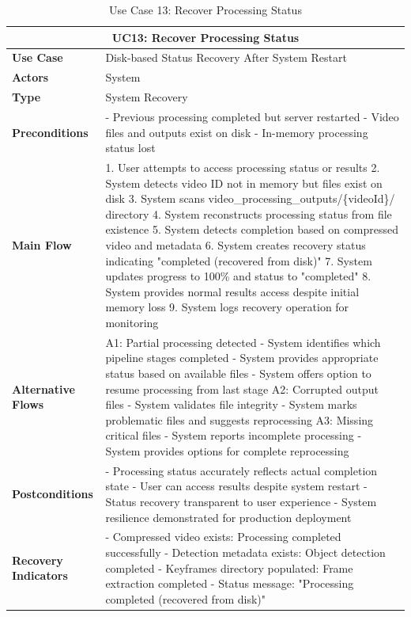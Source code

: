 \documentclass{article}
\begin{document}
\begin{table}[H]
\centering
\begin{tabularx}{\textwidth}{|l|X|}
\hline
\multicolumn{2}{|c|}{\textbf{UC13: Recover Processing Status}} \\ \hline
\textbf{Use Case} & Disk-based Status Recovery After System Restart \\ \hline
\textbf{Actors} & System \\ \hline
\textbf{Type} & System Recovery \\ \hline
\textbf{Preconditions} & 
- Previous processing completed but server restarted
- Video files and outputs exist on disk
- In-memory processing status lost \\ \hline
\textbf{Main Flow} & 
1. User attempts to access processing status or results
2. System detects video ID not in memory but files exist on disk
3. System scans video\_processing\_outputs/\{videoId\}/ directory
4. System reconstructs processing status from file existence
5. System detects completion based on compressed video and metadata
6. System creates recovery status indicating "completed (recovered from disk)"
7. System updates progress to 100\% and status to "completed"
8. System provides normal results access despite initial memory loss
9. System logs recovery operation for monitoring \\ \hline
\textbf{Alternative Flows} & 
A1: Partial processing detected
- System identifies which pipeline stages completed
- System provides appropriate status based on available files
- System offers option to resume processing from last stage
A2: Corrupted output files
- System validates file integrity
- System marks problematic files and suggests reprocessing
A3: Missing critical files
- System reports incomplete processing
- System provides options for complete reprocessing \\ \hline
\textbf{Postconditions} & 
- Processing status accurately reflects actual completion state
- User can access results despite system restart
- Status recovery transparent to user experience
- System resilience demonstrated for production deployment \\ \hline
\textbf{Recovery Indicators} & 
- Compressed video exists: Processing completed successfully
- Detection metadata exists: Object detection completed
- Keyframes directory populated: Frame extraction completed
- Status message: "Processing completed (recovered from disk)" \\ \hline
\end{tabularx}
\caption{Use Case 13: Recover Processing Status}
\end{table}
\end{document}
